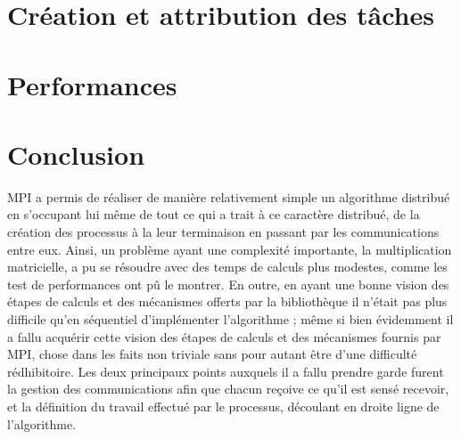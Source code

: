 \documentclass[a4paper,11pt]{article}
\begin{document}
\section{Création et attribution des tâches}


\section{Performances}

\section{Conclusion}

MPI a permis de réaliser de manière relativement simple un algorithme distribué en s'occupant lui même de tout ce qui a trait à ce caractère distribué, de la création des processus à la leur terminaison en passant par les communications entre eux. Ainsi, un problème ayant une complexité importante, la multiplication matricielle, a pu se résoudre avec des temps de calculs plus modestes, comme les test de performances ont pû le montrer. En outre, en ayant une bonne vision des étapes de calculs et des mécanismes offerts par la bibliothèque il n'était pas plus difficile qu'en séquentiel d'implémenter l'algorithme ; même si bien évidemment il a fallu acquérir cette vision des étapes de calculs et des mécanismes fournis par MPI, chose dans les faits non triviale sans pour autant être d'une difficulté rédhibitoire. Les deux principaux points auxquels il a fallu prendre garde furent la gestion des communications afin que chacun reçoive ce qu'il est sensé recevoir, et la définition du travail effectué par le processus, découlant en droite ligne de l'algorithme.
\end{document}
